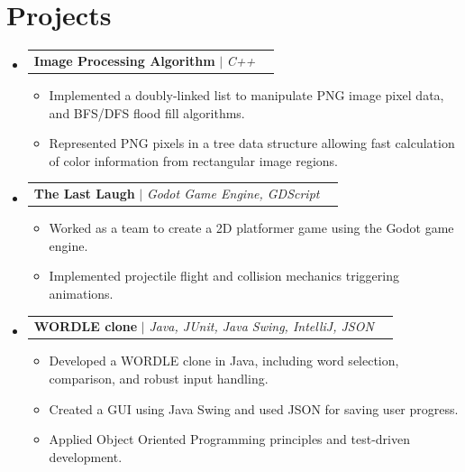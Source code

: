 \documentclass[letterpaper,11pt]{article}
\makeatletter
\newcommand{\resumeItem}[1]{
  \item\small{
    {#1 \vspace{-2pt}}
  }
}
\newcommand{\resumeProjectHeading}[2]{
    \item
    \begin{tabular*}{0.97\textwidth}{l@{\extracolsep{\fill}}r}
      \small#1 & #2 \\
    \end{tabular*}\vspace{-7pt}
}
\newcommand{\resumeSubHeadingListStart}{\begin{itemize}[leftmargin=0.15in, label={}]}
\newcommand{\resumeSubHeadingListEnd}{\end{itemize}}
\newcommand{\resumeItemListStart}{\begin{itemize}}
\newcommand{\resumeItemListEnd}{\end{itemize}\vspace{-5pt}}
\makeatother
\begin{document}
\section{Projects}
    \resumeSubHeadingListStart
    \resumeProjectHeading
          {\textbf{Image Processing Algorithm} $|$ \emph{C++}}{}
            \resumeItemListStart
              \resumeItem{Implemented a doubly-linked list to manipulate PNG image pixel data, and BFS/DFS flood fill algorithms.}
              \resumeItem{Represented PNG pixels in a tree data structure allowing fast calculation of color information from rectangular image regions.}
            \resumeItemListEnd
    \resumeProjectHeading
          {\textbf{The Last Laugh} $|$ \emph{Godot Game Engine, GDScript}}{}
          \resumeItemListStart
            \resumeItem{Worked as a team to create a 2D platformer game using the Godot game engine.}
            \resumeItem{Implemented projectile flight and collision mechanics triggering animations.}
          \resumeItemListEnd
      \resumeProjectHeading
          {\textbf{WORDLE clone} $|$ \emph{Java, JUnit, Java Swing, IntelliJ, JSON}}{}
          \resumeItemListStart
            \resumeItem{Developed a WORDLE clone in Java, including word selection, comparison, and robust input handling.}
            \resumeItem{Created a GUI using Java Swing and used JSON for saving user progress.}
            \resumeItem{Applied Object Oriented Programming principles and test-driven development.}

          \resumeItemListEnd

                  
      
    \resumeSubHeadingListEnd


\end{document}
